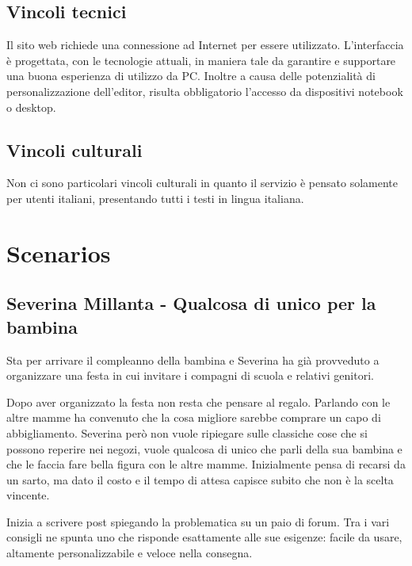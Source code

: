 \documentclass[12pt,italian,]{report}
\begin{document}
\subsection{Vincoli tecnici}\label{vincoli-tecnici}

Il sito web richiede una connessione ad Internet per essere utilizzato.
L'interfaccia è progettata, con le tecnologie attuali, in maniera tale da garantire e supportare una buona esperienza di utilizzo da PC.
Inoltre a causa delle potenzialità di personalizzazione dell'editor, risulta obbligatorio l'accesso da dispositivi notebook o desktop.

\subsection{Vincoli culturali}\label{vincoli-culturali}

Non ci sono particolari vincoli culturali in quanto il servizio è pensato solamente per utenti italiani, presentando tutti i testi in lingua italiana. 

\section{Scenarios}\label{scenarios}

\hypertarget{severina-millanta---qualcosa-di-unico-per-la-bambina}{%
\subsection{Severina Millanta - Qualcosa di unico per la
bambina}\label{severina-millanta---qualcosa-di-unico-per-la-bambina}}

Sta per arrivare il compleanno della bambina e Severina ha già
provveduto a organizzare una festa in cui invitare i compagni di scuola
e relativi genitori.

Dopo aver organizzato la festa non resta che pensare al regalo. Parlando
con le altre mamme ha convenuto che la cosa migliore sarebbe comprare un
capo di abbigliamento. Severina però non vuole ripiegare sulle classiche
cose che si possono reperire nei negozi, vuole qualcosa di unico che
parli della sua bambina e che le faccia fare bella figura con le altre
mamme. Inizialmente pensa di recarsi da un sarto, ma dato il costo e il
tempo di attesa capisce subito che non è la scelta vincente.

Inizia a scrivere post spiegando la problematica su un paio di forum.
Tra i vari consigli ne spunta uno che risponde esattamente alle sue
esigenze: facile da usare, altamente personalizzabile e veloce nella
consegna.
\end{document}
